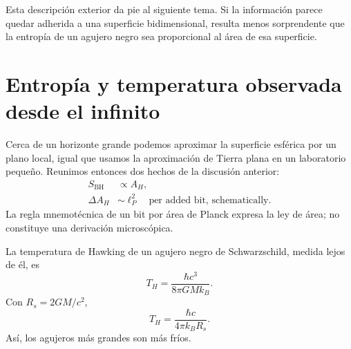 \begin{classroomqa}
\end{classroomqa}

Esta descripción exterior da pie al siguiente tema. Si la información parece quedar adherida a una superficie bidimensional, resulta menos sorprendente que la entropía de un agujero negro sea proporcional al área de esa superficie.

\section{Entropía y temperatura observada desde el infinito}

Cerca de un horizonte grande podemos aproximar la superficie esférica por un plano local, igual que usamos la aproximación de Tierra plana en un laboratorio pequeño. Reunimos entonces dos hechos de la discusión anterior:
\begin{equation}
\begin{aligned}
S_{\mathrm{BH}}&\propto A_H,\\
\Delta A_H&\sim \ell_P^2
\quad\text{per added bit, schematically}.
\end{aligned}
\end{equation}
La regla mnemotécnica de un bit por área de Planck expresa la ley de área; no constituye una derivación microscópica.

La temperatura de Hawking de un agujero negro de Schwarzschild, medida lejos de él, es
\begin{equation}
T_H=\frac{\hbar c^3}{8\pi GMk_B}.
\label{eq:l05-hawking}
\end{equation}
Con \(R_s=2GM/c^2\),
\begin{equation}
T_H=\frac{\hbar c}{4\pi k_B R_s}.
\label{eq:l05-hawking-radius}
\end{equation}
Así, los agujeros más grandes son más fríos.

\begin{classroomqa}
\end{classroomqa}

